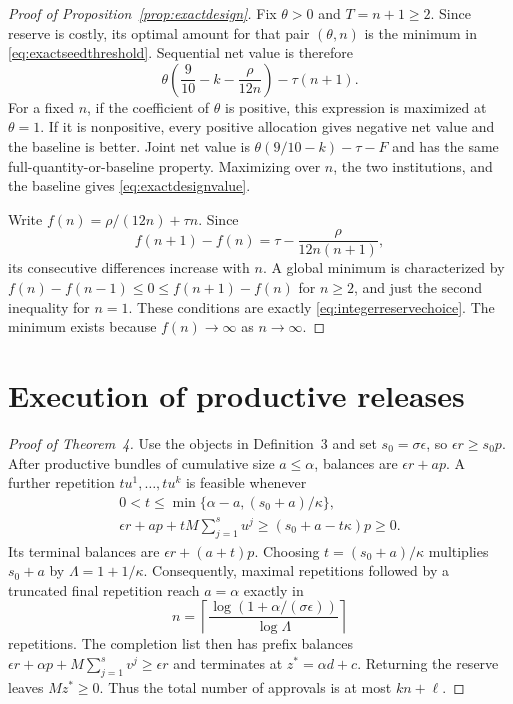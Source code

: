 \documentclass[ecta,draft,supplement]{econsocart}
\theoremstyle{definition}
\theoremstyle{definition}
\begin{document}
\begin{appendix}
\begin{proof}[Proof of Proposition~\ref{prop:exactdesign}]
Fix $\theta>0$ and $T=n+1\geq2$. Since reserve is costly, its optimal
amount for that pair $(\theta,n)$ is the minimum in
\eqref{eq:exactseedthreshold}. Sequential net value is therefore
\[
 \theta\left(\frac9{10}-k-\frac\rho{12n}\right)-\tau(n+1).
\]
For a fixed $n$, if the coefficient of $\theta$ is positive, this expression
is maximized at $\theta=1$. If it is nonpositive, every positive allocation
gives negative net value and the baseline is better. Joint net value is
$\theta(9/10-k)-\tau-F$ and has the same full-quantity-or-baseline
property. Maximizing over $n$, the two institutions, and the baseline gives
\eqref{eq:exactdesignvalue}.

Write $f(n)=\rho/(12n)+\tau n$. Since
\[
 f(n+1)-f(n)=\tau-\frac\rho{12n(n+1)},
\]
its consecutive differences increase with $n$. A global minimum is
characterized by $f(n)-f(n-1)\leq0\leq f(n+1)-f(n)$ for $n\geq2$,
and just the second inequality for $n=1$. These conditions are exactly
\eqref{eq:integerreservechoice}. The minimum exists because
$f(n)\to\infty$ as $n\to\infty$.
\end{proof}

\section{Execution of productive releases}
\label{app:generalproductive}

\begin{proof}[Proof of Theorem~4%
]
Use the objects in Definition~3%
 and set
$s_0=\sigma\epsilon$, so $\epsilon r\geq s_0p$.
After productive bundles of cumulative size $a\leq\alpha$, balances are
$\epsilon r+ap$. A further repetition $tu^1,\ldots,tu^k$ is feasible whenever
\[
 \begin{gathered}
 0<t\leq\min\{\alpha-a,(s_0+a)/\kappa\},\\
 \epsilon r+ap+tM\sum_{j=1}^s u^j
 \geq(s_0+a-t\kappa)p\geq0.
 \end{gathered}
\]
Its terminal balances are $\epsilon r+(a+t)p$. Choosing
$t=(s_0+a)/\kappa$ multiplies $s_0+a$ by $\Lambda=1+1/\kappa$.
Consequently, maximal repetitions followed by a truncated final repetition
reach $a=\alpha$ exactly in
\[
 n=\left\lceil
       \frac{\log(1+\alpha/(\sigma\epsilon))}{\log\Lambda}
     \right\rceil
\]
repetitions. The completion list then has prefix balances
$\epsilon r+\alpha p+M\sum_{j=1}^s v^j\geq\epsilon r$ and terminates at
$z^*=\alpha d+c$. Returning the reserve leaves $Mz^*\geq0$.
Thus the total number of approvals is at most $kn+\ell$.


\end{proof}
\end{appendix}
\end{document}
